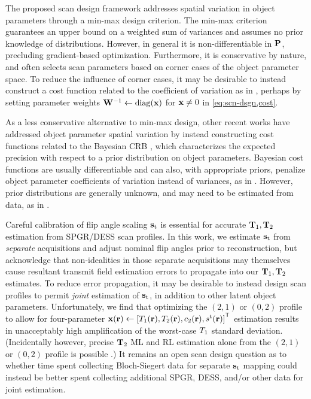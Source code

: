 The proposed scan design framework addresses spatial variation 
in object parameters through a min-max design criterion.
The min-max criterion guarantees an upper bound 
on a weighted sum of variances 
and assumes no prior knowledge of distributions.
However, in general it is non-differentiable 
in $\mathbf{P}$, precluding gradient-based optimization. 	
Furthermore, it is conservative by nature, 
and often selects scan parameters based 
on corner cases of the object parameter space.
To reduce the influence of corner cases, 
it may be desirable to instead construct a cost function 
related to the coefficient of variation 
as in \cite{jones:96:oss, zhang:98:dos, imran:99:tpm, deoni:04:doo}, 
perhaps by setting parameter weights $\bmW^{-1} \gets \diag{\bmx}$ 
for $\mathbf{x} \neq 0$ in \eqref{eq:scn-dsgn,cost}.
	
As a less conservative alternative 
to min-max design, 
other recent works \cite{akcakaya:15:ots, lewis:16:ddo} 
have addressed object parameter spatial variation 
by instead constructing cost functions related 
to the Bayesian CRB \cite{gill:95:aot}, 
which characterizes the expected precision 
with respect to a prior distribution on object parameters.
Bayesian cost functions are usually differentiable and can also, 
with appropriate priors, 
penalize object parameter coefficients of variation 
instead of variances, 
as in \cite{akcakaya:15:ots}.
However, prior distributions are generally unknown, 
and may need to be estimated from data, 
as in \cite{lewis:16:ddo}.

Careful calibration of flip angle scaling $\mathbf{s}_\mathrm{t}$ is essential 
for accurate $\mathbf{T}_1, \mathbf{T}_2$ estimation 
from SPGR/DESS scan profiles. 
In this work, we estimate $\mathbf{s}_\mathrm{t}$ 
from \emph{separate} acquisitions 
and adjust nominal flip angles prior to reconstruction, 
but acknowledge that non-idealities 
in those separate acquisitions may themselves 
cause resultant transmit field estimation errors 
to propagate into our $\mathbf{T}_1,\mathbf{T}_2$ estimates. 
To reduce error propagation, 
it may be desirable to instead design scan profiles 
to permit \emph{joint} estimation of $\mathbf{s}_\mathrm{t}$, 
in addition to other latent object parameters.
Unfortunately, 
we find that optimizing the $(2,1)$ or $(0,2)$ profile 
to allow for four-parameter 
$\bmx\pr \gets \brac{\To\pr, \Tt\pr, \const{2}\pr, \stx\pr}\tpose$ estimation 
results in unacceptably high amplification 
of the worst-case $T_1$ standard deviation. 
(Incidentally however, precise $\mathbf{T}_2$ ML and RL estimation alone 
from the $(2,1)$ or $(0,2)$ profile 
is possible \cite{nataraj:14:mbe}.) 
It remains an open scan design question 
as to whether time spent collecting Bloch-Siegert data 
for separate $\mathbf{s}_\mathrm{t}$ mapping could instead be better spent 
collecting additional SPGR, DESS, 
and/or other data for joint estimation.

